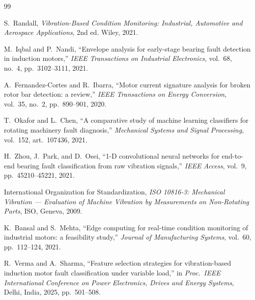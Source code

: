 \begin{thebibliography}{99}

 S.\ Randall, \emph{Vibration-Based Condition Monitoring: Industrial, Automotive
and Aerospace Applications}, 2nd ed. Wiley, 2021.

 M.\ Iqbal and P.\ Nandi, ``Envelope analysis for early-stage bearing fault
detection in induction motors,'' \emph{IEEE Transactions on Industrial Electronics}, vol.\ 68,
no.\ 4, pp.\ 3102--3111, 2021.

 A.\ Fernandez-Cortes and R.\ Ibarra, ``Motor current signature analysis for
broken rotor bar detection: a review,'' \emph{IEEE Transactions on Energy Conversion}, vol.\ 35,
no.\ 2, pp.\ 890--901, 2020.

 T.\ Okafor and L.\ Chen, ``A comparative study of machine learning classifiers
for rotating machinery fault diagnosis,'' \emph{Mechanical Systems and Signal Processing},
vol.\ 152, art.\ 107436, 2021.

 H.\ Zhou, J.\ Park, and D.\ Osei, ``1-D convolutional neural networks for
end-to-end bearing fault classification from raw vibration signals,'' \emph{IEEE Access}, vol.\
9, pp.\ 45210--45221, 2021.

 International Organization for Standardization, \emph{ISO 10816-3: Mechanical
Vibration --- Evaluation of Machine Vibration by Measurements on Non-Rotating Parts}, ISO,
Geneva, 2009.

 K.\ Bansal and S.\ Mehta, ``Edge computing for real-time condition monitoring of
industrial motors: a feasibility study,'' \emph{Journal of Manufacturing Systems}, vol.\ 60,
pp.\ 112--124, 2021.

 R.\ Verma and A.\ Sharma, ``Feature selection strategies for vibration-based
induction motor fault classification under variable load,'' in \emph{Proc.\ IEEE International
Conference on Power Electronics, Drives and Energy Systems}, Delhi, India, 2025, pp.\ 501--508.

\end{thebibliography}

\appendix
